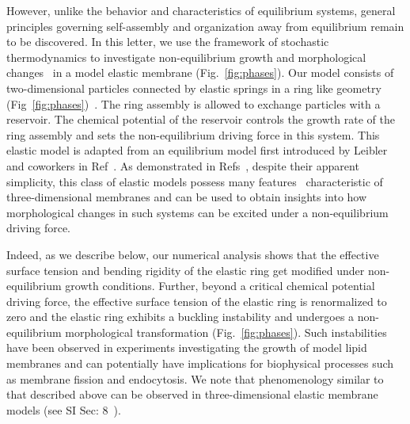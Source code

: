 \documentclass[amsmath,preprintnumbers,10pt,nofootinbib,prl,twocolumn]{revtex4-1}
\begin{document}
However, unlike the behavior and characteristics of equilibrium systems, general principles governing self-assembly and organization away from equilibrium remain to be discovered. In this letter, we use the framework of stochastic thermodynamics to investigate non-equilibrium growth and morphological changes~\cite{Drasdo2000, Ramaswamy2000,Rao2001,Solon2006,Hannezo2011,Fisher1989,Fisher1989a,Rudnick1991,Rajesh2008,Nelson2009,Mahadevan2019,Wolde2019} in a model elastic membrane (Fig.~\ref{fig:phases}). Our model consists of two-dimensional particles connected by elastic springs in a ring like geometry (Fig~\ref{fig:phases})~\cite{Fisher1989,Fisher1989a,Rudnick1991,Rajesh2008,Nelson2009}. The ring assembly is allowed to exchange particles with a reservoir. The chemical potential of the reservoir controls the growth rate of the ring assembly and sets the non-equilibrium driving force in this system. This elastic model is adapted from an equilibrium model first introduced by Leibler and coworkers in Ref~\cite{Fisher1989}. As demonstrated in Refs~\cite{Fisher1989,Fisher1989a,Rudnick1991,Rajesh2008,Nelson2009}, despite their apparent simplicity, this class of elastic models possess many features~\cite{W.Helfrich1973,Fisher1989,Fisher1989a,Rudnick1991,Ramaswamy2000,Rao2001,Solon2006,Rajesh2008,Hannezo2011,Loubet2012,Nelson2009} characteristic of three-dimensional membranes and can be used to obtain insights into how morphological changes in such systems can be excited under a non-equilibrium driving force.

Indeed, as we describe below, our numerical analysis shows that the effective surface tension and bending rigidity of the elastic ring get modified under non-equilibrium growth conditions. Further, beyond a critical chemical potential driving force, the effective surface tension of the elastic ring is renormalized to zero and the elastic ring exhibits a buckling instability and undergoes a non-equilibrium morphological transformation (Fig.~\ref{fig:phases}). Such instabilities have been observed in experiments investigating the growth of model lipid membranes \cite{Solon2006} and can potentially have implications for biophysical processes such as membrane fission and endocytosis. We note that phenomenology similar to that described above can be observed in three-dimensional elastic membrane models (see SI Sec: 8~\cite{Supplementary}).
\end{document}
